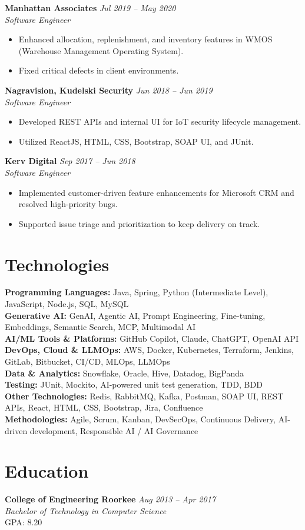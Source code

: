 \documentclass[10pt,letterpaper]{article}
\begin{document}
\textbf{Manhattan Associates} \hfill \textit{Jul 2019 -- May 2020}\\
\textit{Software Engineer}
\begin{itemize}
\item Enhanced allocation, replenishment, and inventory features in WMOS (Warehouse Management Operating System).
\item Fixed critical defects in client environments.
\end{itemize}

\textbf{Nagravision, Kudelski Security} \hfill \textit{Jun 2018 -- Jun 2019}\\
\textit{Software Engineer}
\begin{itemize}
\item Developed REST APIs and internal UI for IoT security lifecycle management.
\item Utilized ReactJS, HTML, CSS, Bootstrap, SOAP UI, and JUnit.
\end{itemize}

\textbf{Kerv Digital} \hfill \textit{Sep 2017 -- Jun 2018}\\
\textit{Software Engineer}
\begin{itemize}
\item Implemented customer-driven feature enhancements for Microsoft CRM and resolved high-priority bugs.
\item Supported issue triage and prioritization to keep delivery on track.
\end{itemize}

\section*{Technologies}
\textbf{Programming Languages:} Java, Spring, Python (Intermediate Level), JavaScript, Node.js, SQL, MySQL\\
\textbf{Generative AI:} GenAI, Agentic AI, Prompt Engineering, Fine-tuning, Embeddings, Semantic Search, MCP, Multimodal AI\\
\textbf{AI/ML Tools \& Platforms:} GitHub Copilot, Claude, ChatGPT, OpenAI API\\
\textbf{DevOps, Cloud \& LLMOps:} AWS, Docker, Kubernetes, Terraform, Jenkins, GitLab, Bitbucket, CI/CD, MLOps, LLMOps\\
\textbf{Data \& Analytics:} Snowflake, Oracle, Hive, Datadog, BigPanda\\
\textbf{Testing:} JUnit, Mockito, AI-powered unit test generation, TDD, BDD\\
\textbf{Other Technologies:} Redis, RabbitMQ, Kafka, Postman, SOAP UI, REST APIs, React, HTML, CSS, Bootstrap, Jira, Confluence\\
\textbf{Methodologies:} Agile, Scrum, Kanban, DevSecOps, Continuous Delivery, AI-driven development, Responsible AI / AI Governance

\section*{Education}
\textbf{College of Engineering Roorkee} \hfill \textit{Aug 2013 -- Apr 2017}\\
\textit{Bachelor of Technology in Computer Science}\\
GPA: 8.20
\end{document}
